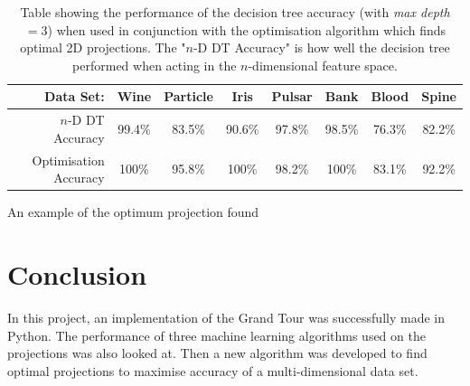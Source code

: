 \documentclass[a4paper,11pt,twoside]{article}
\begin{document}
\begin{table}[h]
\caption{Table showing the performance of the decision tree accuracy (with \textit{max depth }$=3$) when used in conjunction with the optimisation algorithm which finds optimal 2D projections. The "$n$-D DT Accuracy" is how well the decision tree performed when acting in the $n$-dimensional feature space.}
\begin{tabular}{|r|c|c|c|c|c|c|c|}
\hline
Data Set:             & Wine   & Particle & Iris   & Pulsar & Bank   & Blood  & Spine  \\ \hline
$n$-D DT Accuracy       & 99.4\% & 83.5\%   & 90.6\% & 97.8\% & 98.5\% & 76.3\% & 82.2\% \\ \hline
Optimisation Accuracy & 100\%  & 95.8\%   & 100\%  & 98.2\% & 100\%  & 83.1\% & 92.2\% \\ \hline
\end{tabular}
\end{table}

An example of the optimum projection found

\newpage
\section{Conclusion}

In this project, an implementation of the Grand Tour was successfully made in Python. The performance of three machine learning algorithms used on the projections was also looked at. Then a new algorithm was developed to find optimal projections to maximise accuracy of a multi-dimensional data set.
\newline
\end{document}
